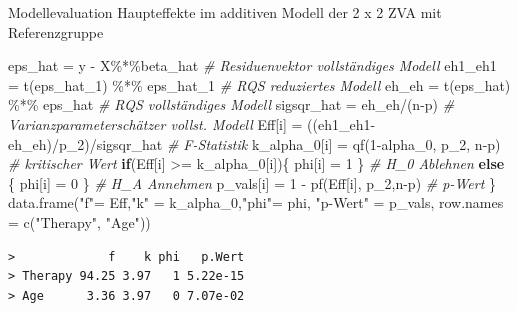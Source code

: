 \documentclass[
  8pt,
  ignorenonframetext,
]{beamer}
\newenvironment{Shaded}{\begin{snugshade}}{\end{snugshade}}
\newcommand{\AttributeTok}[1]{\textcolor[rgb]{0.77,0.63,0.00}{#1}}
\newcommand{\CommentTok}[1]{\textcolor[rgb]{0.56,0.35,0.01}{\textit{#1}}}
\newcommand{\ControlFlowTok}[1]{\textcolor[rgb]{0.13,0.29,0.53}{\textbf{#1}}}
\newcommand{\DecValTok}[1]{\textcolor[rgb]{0.00,0.00,0.81}{#1}}
\newcommand{\FunctionTok}[1]{\textcolor[rgb]{0.00,0.00,0.00}{#1}}
\newcommand{\NormalTok}[1]{#1}
\newcommand{\OtherTok}[1]{\textcolor[rgb]{0.56,0.35,0.01}{#1}}
\newcommand{\SpecialCharTok}[1]{\textcolor[rgb]{0.00,0.00,0.00}{#1}}
\newcommand{\StringTok}[1]{\textcolor[rgb]{0.31,0.60,0.02}{#1}}
\begin{document}
\begin{frame}[fragile]{\small Modellevaluation \textbar{} Haupteffekte
im additiven Modell der 2 x 2 ZVA mit Referenzgruppe}
\begin{Shaded}
\begin{Highlighting}[]
\NormalTok{    eps\_hat      }\OtherTok{=}\NormalTok{ y }\SpecialCharTok{{-}}\NormalTok{ X}\SpecialCharTok{\%*\%}\NormalTok{beta\_hat                      }\CommentTok{\# Residuenvektor vollständiges Modell}
\NormalTok{    eh1\_eh1      }\OtherTok{=} \FunctionTok{t}\NormalTok{(eps\_hat\_1) }\SpecialCharTok{\%*\%}\NormalTok{ eps\_hat\_1            }\CommentTok{\# RQS reduziertes Modell}
\NormalTok{    eh\_eh        }\OtherTok{=} \FunctionTok{t}\NormalTok{(eps\_hat) }\SpecialCharTok{\%*\%}\NormalTok{ eps\_hat                }\CommentTok{\# RQS vollständiges Modell}
\NormalTok{    sigsqr\_hat   }\OtherTok{=}\NormalTok{ eh\_eh}\SpecialCharTok{/}\NormalTok{(n}\SpecialCharTok{{-}}\NormalTok{p)                           }\CommentTok{\# Varianzparameterschätzer vollst. Modell}
\NormalTok{    Eff[i]       }\OtherTok{=}\NormalTok{ ((eh1\_eh1}\SpecialCharTok{{-}}\NormalTok{eh\_eh)}\SpecialCharTok{/}\NormalTok{p\_2)}\SpecialCharTok{/}\NormalTok{sigsqr\_hat      }\CommentTok{\# F{-}Statistik}
\NormalTok{    k\_alpha\_0[i] }\OtherTok{=} \FunctionTok{qf}\NormalTok{(}\DecValTok{1}\SpecialCharTok{{-}}\NormalTok{alpha\_0, p\_2, n}\SpecialCharTok{{-}}\NormalTok{p)               }\CommentTok{\# kritischer Wert}
    \ControlFlowTok{if}\NormalTok{(Eff[i] }\SpecialCharTok{\textgreater{}=}\NormalTok{ k\_alpha\_0[i])\{ phi[i] }\OtherTok{=} \DecValTok{1}\NormalTok{ \}             }\CommentTok{\# H\_0 Ablehnen}
    \ControlFlowTok{else}\NormalTok{ \{                      phi[i] }\OtherTok{=} \DecValTok{0}\NormalTok{ \}             }\CommentTok{\# H\_A Annehmen}
\NormalTok{    p\_vals[i]    }\OtherTok{=} \DecValTok{1} \SpecialCharTok{{-}} \FunctionTok{pf}\NormalTok{(Eff[i], p\_2,n}\SpecialCharTok{{-}}\NormalTok{p)               }\CommentTok{\# p{-}Wert}
\NormalTok{\}}
\FunctionTok{data.frame}\NormalTok{(}\StringTok{"f"}\OtherTok{=}\NormalTok{ Eff,}\StringTok{"k"} \OtherTok{=}\NormalTok{ k\_alpha\_0,}\StringTok{"phi"}\OtherTok{=}\NormalTok{ phi, }\StringTok{"p{-}Wert"} \OtherTok{=}\NormalTok{ p\_vals, }\AttributeTok{row.names =} \FunctionTok{c}\NormalTok{(}\StringTok{"Therapy"}\NormalTok{, }\StringTok{"Age"}\NormalTok{))}
\end{Highlighting}
\end{Shaded}

\begin{verbatim}
>             f    k phi   p.Wert
> Therapy 94.25 3.97   1 5.22e-15
> Age      3.36 3.97   0 7.07e-02
\end{verbatim}
\end{frame}
\end{document}
